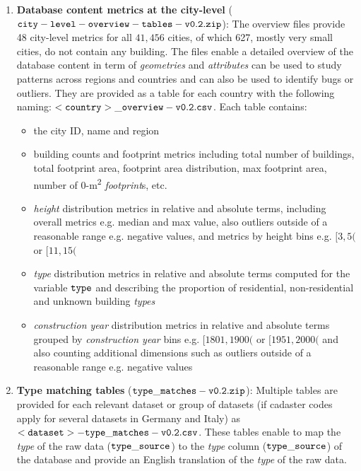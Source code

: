 \documentclass[fleqn,10pt]{wlscirep}
\begin{document}
\begin{enumerate}[topsep=1pt]
    \item \textbf{Database content metrics at the city-level} (${\tt city-level-overview-tables-v0.2.zip}$): The overview files provide 48 city-level metrics for all $41,456$ cities, of which 627, mostly very small cities, do not contain any building. The files enable a detailed overview of the database content in term of \textit{geometries} and \textit{attributes} can be used to study patterns across regions and countries and can also be used to identify bugs or outliers. They are provided as a table for each country with the following naming: ${\tt <country>\_overview-v0.2.csv}$. Each table contains:
    
    \begin{itemize}[topsep=1pt]
        \itemsep-0.05em  
        \item the city ID, name and region
        \item building counts and footprint metrics including total number of buildings, total footprint area, footprint area distribution, max footprint area, number of 0-m\textsuperscript{2} \textit{footprint}s, etc.
        \item \textit{height} distribution metrics in relative and absolute terms, including overall metrics e.g. median and max value, also outliers outside of a reasonable range e.g. negative values, and metrics by height bins e.g. $[3,5($ or $[11,15($
        \item \textit{type} distribution metrics in relative and absolute terms computed for the variable $\tt{type}$ and describing the proportion of residential, non-residential and unknown building \textit{types}
        \item \textit{construction year} distribution metrics in relative and absolute terms grouped by \textit{construction year} bins e.g. $[1801,1900($ or $[1951,2000($ and also counting additional dimensions such as outliers outside of a reasonable range e.g. negative values 
    \end{itemize}

    \item \textbf{Type matching tables} (${\tt type\_matches-v0.2.zip}$): Multiple tables are provided for each relevant dataset or group of datasets (if cadaster codes apply for several datasets in Germany and Italy) as ${\tt <dataset>-type\_matches-v0.2.csv}$. These tables enable to map the \textit{type} of the raw data (${\tt type\_source}$) to the \textit{type} column (${\tt type\_source}$) of the database and provide an English translation of the \textit{type} of the raw data.
    

\end{enumerate}
\end{document}
